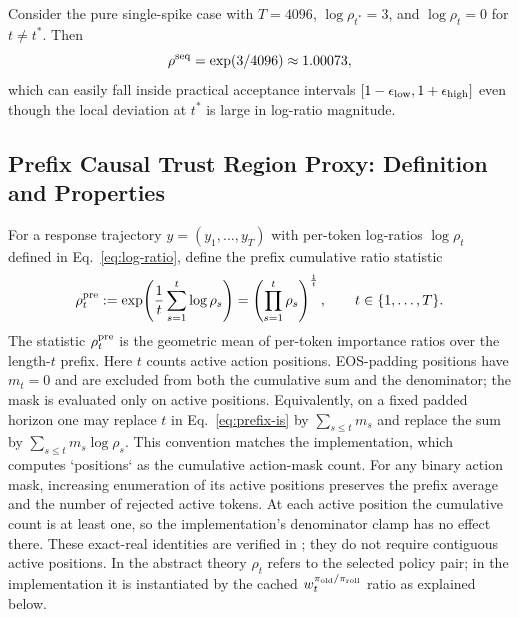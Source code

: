 \begin{example}
Consider the pure single-spike case with $T=4096$, $\log\rho_{t^*}=3$, and $\log\rho_t=0$ for $t\neq t^*$. Then
\begin{equation*}
    \rho^{\mathrm{seq}} = \exp(3/4096) \approx 1.00073,
\end{equation*}
which can easily fall inside practical acceptance intervals $[1-\epsilon_{\mathrm{low}},1+\epsilon_{\mathrm{high}}]$ even though the local deviation at $t^*$ is large in
log-ratio magnitude.
\end{example}

\subsection{Prefix Causal Trust Region Proxy: Definition and Properties}
\label{sec:prefix-is}

\begin{definition}
\label{def:prefix-is}
For a response trajectory $y=(y_1,\ldots,y_T)$ with per-token log-ratios $\log\rho_t$ defined in Eq.~\eqref{eq:log-ratio}, define the prefix
cumulative ratio statistic
\begin{equation}
    \rho_{t}^{\mathrm{pre}}
    := \exp\!\left(\frac{1}{t}\sum_{s=1}^{t} \log\rho_s\right)
    = \left(\prod_{s=1}^{t}\rho_s\right)^{\frac{1}{t}},
    \qquad
    t\in\{1,\ldots,T\}.
    \label{eq:prefix-is}
\end{equation}
The statistic $\rho_{t}^{\mathrm{pre}}$ is the geometric mean of per-token importance ratios over the length-$t$ prefix.
Here $t$ counts active action positions. EOS-padding positions have $m_t=0$ and are excluded from both the cumulative sum and
the denominator; the mask is evaluated only on active positions. Equivalently, on a fixed padded horizon one may replace $t$ in
Eq.~\eqref{eq:prefix-is} by $\sum_{s\le t}m_s$ and replace the sum by $\sum_{s\le t}m_s\log\rho_s$. This convention matches the
implementation, which computes `positions` as the cumulative action-mask count.
For any binary action mask, increasing enumeration of its active positions
preserves the prefix average and the number of rejected active tokens.
At each active position the cumulative count is at least one, so the
implementation's denominator clamp has no effect there. These exact-real
identities are verified in ; they do not
require contiguous active positions.
In the abstract theory $\rho_t$ refers to the selected policy pair; in the
implementation it is instantiated by the cached
$w_t^{\pi_{\mathrm{old}}/\pi_{\mathrm{roll}}}$ ratio as explained below.
\end{definition}

